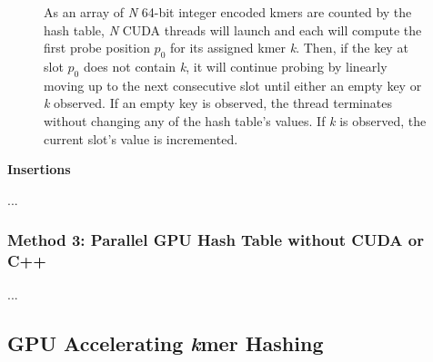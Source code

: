 \begin{figure}[H]
\begin{center}
{
}
\caption{
  As an array of \textit{N} 64-bit integer encoded kmers are counted by the hash table, \textit{N} CUDA threads will launch and each will compute the first probe position $p_0$ for its assigned kmer \textit{k}. Then, if the key at slot $p_0$ does not contain \textit{k}, it will continue probing by linearly moving up to the next consecutive slot until either an empty key or \textit{k} observed. If an empty key is observed, the thread terminates without changing any of the hash table's values. If \textit{k} is observed, the current slot's value is incremented.
}
\label{methods:gpu_accelerating_kmer_counting:method2:figures:probing_scheme}
\end{center}
\end{figure}

\textbf{Insertions}

...

\subsubsection{Method 3: Parallel GPU Hash Table without CUDA or C++}
...

\subsection{GPU Accelerating \textit{k}mer Hashing}

